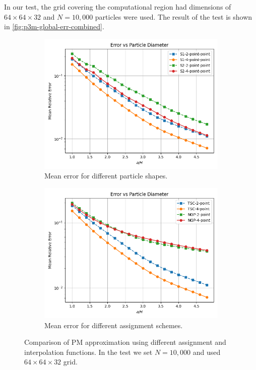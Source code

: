 In our test, the grid covering the computational region had dimensions of $64\times 64\times 32$ and $N=10{,}000$ particles were used.
The result of the test is shown in \autoref{fig:p3m-global-err-combined}.
\begin{figure}[htp]
    \centering
    \begin{subfigure}[b]{0.48\textwidth}
        \centering
        \includegraphics[width=\textwidth]{chapters/p3m-method/img/err_vs_part_diam_p3m.png}
        \caption{Mean error for different particle shapes.}
        \label{fig:reference-force-approx-different-shapes-sub}
    \end{subfigure}
    \hfill
    \begin{subfigure}[b]{0.48\textwidth}
        \centering
        \includegraphics[width=\textwidth]{chapters/p3m-method/img/no-cic.png}
        \caption{Mean error for different assignment schemes.}
        \label{fig:reference-force-error-different-schemes-sub}
    \end{subfigure}
    \caption{Comparison of PM approximation using different assignment and interpolation functions.
    In the test we set $N=10{,}000$ and used $64\times 64\times 32$ grid.
    }
    \label{fig:p3m-global-err-combined}
\end{figure}
